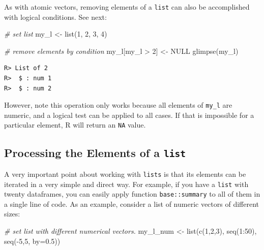 \documentclass[
  12pt,
]{book}
\newenvironment{Shaded}{\begin{snugshade}}{\end{snugshade}}
\newcommand{\AttributeTok}[1]{\textcolor[rgb]{0.61,0.61,0.61}{#1}}
\newcommand{\CommentTok}[1]{\textcolor[rgb]{0.37,0.37,0.37}{\textit{#1}}}
\newcommand{\ConstantTok}[1]{\textcolor[rgb]{0,0,0}{#1}}
\newcommand{\DecValTok}[1]{\textcolor[rgb]{0.06,0.06,0.06}{#1}}
\newcommand{\FloatTok}[1]{\textcolor[rgb]{0.06,0.06,0.06}{#1}}
\newcommand{\FunctionTok}[1]{\textcolor[rgb]{0,0,0}{#1}}
\newcommand{\NormalTok}[1]{#1}
\newcommand{\OtherTok}[1]{\textcolor[rgb]{0.37,0.37,0.37}{#1}}
\newcommand{\SpecialCharTok}[1]{\textcolor[rgb]{0,0,0}{#1}}
\begin{document}
As with atomic vectors, removing elements of a \texttt{list} can also be accomplished with logical conditions. See next:

\begin{Shaded}
\begin{Highlighting}[]
\CommentTok{\# set list}
\NormalTok{my\_l }\OtherTok{\textless{}{-}} \FunctionTok{list}\NormalTok{(}\DecValTok{1}\NormalTok{, }\DecValTok{2}\NormalTok{, }\DecValTok{3}\NormalTok{, }\DecValTok{4}\NormalTok{)}

\CommentTok{\# remove elements by condition}
\NormalTok{my\_l[my\_l }\SpecialCharTok{\textgreater{}} \DecValTok{2}\NormalTok{] }\OtherTok{\textless{}{-}} \ConstantTok{NULL}
\FunctionTok{glimpse}\NormalTok{(my\_l)}
\end{Highlighting}
\end{Shaded}

\begin{verbatim}
R> List of 2
R>  $ : num 1
R>  $ : num 2
\end{verbatim}

However, note this operation only works because all elements of \texttt{my\_l} are numeric, and a logical test can be applied to all cases. If that is impossible for a particular element, R will return an \texttt{NA} value.

\hypertarget{processing-the-elements-of-a-list}{%
\subsection{\texorpdfstring{Processing the Elements of a \texttt{list}}{Processing the Elements of a list}}\label{processing-the-elements-of-a-list}}

A very important point about working with \texttt{lists} is that its elements can be iterated in a very simple and direct way. For example, if you have a \texttt{list} with twenty dataframes, you can easily apply function \texttt{base::summary} to all of them in a single line of code. As an example, consider a list of numeric vectors of different sizes:

\begin{Shaded}
\begin{Highlighting}[]
\CommentTok{\# set list with different numerical vectors.}
\NormalTok{my\_l\_num }\OtherTok{\textless{}{-}} \FunctionTok{list}\NormalTok{(}\FunctionTok{c}\NormalTok{(}\DecValTok{1}\NormalTok{,}\DecValTok{2}\NormalTok{,}\DecValTok{3}\NormalTok{), }
                 \FunctionTok{seq}\NormalTok{(}\DecValTok{1}\SpecialCharTok{:}\DecValTok{50}\NormalTok{), }
                 \FunctionTok{seq}\NormalTok{(}\SpecialCharTok{{-}}\DecValTok{5}\NormalTok{,}\DecValTok{5}\NormalTok{, }\AttributeTok{by=}\FloatTok{0.5}\NormalTok{))}
\end{Highlighting}
\end{Shaded}
\end{document}
